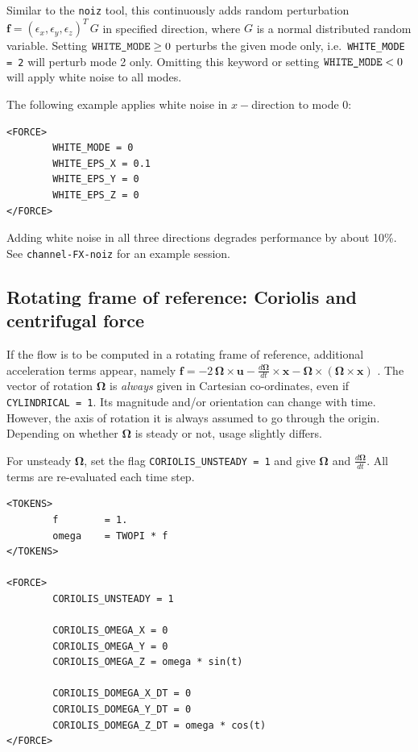 \documentclass[11pt,a4paper]{report}
\newcommand{\ie}{i.e.\ }
\begin{document}
Similar to the \verb+noiz+ tool, this continuously adds random
perturbation $\bm{f} = (\epsilon_x, \epsilon_y, \epsilon_z)^T\,G$ in
specified direction, where $G$ is a normal distributed random
variable. Setting $\verb+WHITE_MODE+ \ge 0$ perturbs the given mode
only, \ie \verb+WHITE_MODE = 2+ will perturb mode 2 only. Omitting
this keyword or setting $\verb+WHITE_MODE+ < 0$ will apply white noise
to all modes.

The following example applies white noise in $x-$direction to mode 0:
\begin{verbatim}
<FORCE>
        WHITE_MODE = 0
        WHITE_EPS_X = 0.1
        WHITE_EPS_Y = 0
        WHITE_EPS_Z = 0
</FORCE>
\end{verbatim}
Adding white noise in all three directions degrades performance by
about 10\%. See \verb+channel-FX-noiz+ for an example session.

\subsection{Rotating frame of reference: Coriolis and centrifugal force}


If the flow is to be computed in a rotating frame of reference,
additional acceleration terms appear, namely $\bm{f} = -2\,\bm{\Omega}
\times \bm{u} - \frac{d\bm{\Omega}}{dt} \times \bm{x} -\bm{\Omega}
\times (\bm{\Omega} \times \bm{x})$ \citep{bat67}. The vector
of rotation $\bm{\Omega}$ is \emph{always} given in Cartesian
co-ordinates, even if \verb|CYLINDRICAL = 1|. Its magnitude and/or
orientation can change with time. However, the axis of rotation it is
always assumed to go through the origin. Depending on whether
$\bm{\Omega}$ is steady or not, usage slightly differs.

For unsteady $\bm{\Omega}$, set the flag \verb|CORIOLIS_UNSTEADY = 1|
and give $\bm{\Omega}$ and $\frac{d\bm{\Omega}}{dt}$. All terms are
re-evaluated each time step.
\begin{verbatim}
<TOKENS>
        f        = 1.
        omega    = TWOPI * f
</TOKENS>

<FORCE>
        CORIOLIS_UNSTEADY = 1

        CORIOLIS_OMEGA_X = 0
        CORIOLIS_OMEGA_Y = 0
        CORIOLIS_OMEGA_Z = omega * sin(t)

        CORIOLIS_DOMEGA_X_DT = 0
        CORIOLIS_DOMEGA_Y_DT = 0
        CORIOLIS_DOMEGA_Z_DT = omega * cos(t)
</FORCE>
\end{verbatim}
\end{document}
